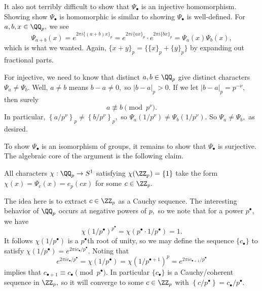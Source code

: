 It also not terribly difficult to show that $\Psi_\bullet$ is an injective homomorphism. Showing show $\Psi_\bullet$ is homomorphic is similar to showing $\Psi_\bullet$ is well-defined. For $a,b,x\in\QQ_p,$ we see
\[\Psi_{a+b}(x)=e^{2\pi i\{(a+b)x\}_p}=e^{2\pi i\{ax\}_p}\cdot e^{2\pi i\{bx\}_p}=\Psi_a(x)\Psi_b(x),\]
which is what we wanted. Again, $\{x+y\}_p=\{\{x\}_p+\{y\}_p\}$ by expanding out fractional parts.

For injective, we need to know that distinct $a,b\in\QQ_p$ give distinct characters $\Psi_a\ne\Psi_b.$ Well, $a\ne b$ means $b-a\ne0,$ so $|b-a|_p>0.$ If we let $|b-a|_p=p^{-\nu},$ then surely
\[a\not\equiv b\pmod{p^\nu}.\]
In particular, $\left\{a/p^\nu\right\}_p\ne\left\{b/p^\nu\right\}_p,$ so $\Psi_a\left(1/p^\nu\right)\ne\Psi_b\left(1/p^\nu\right).$ So $\Psi_a\ne\Psi_b,$ as desired.

To show $\Psi_\bullet$ is an isomorphism of groups, it remains to show that $\Psi_\bullet$ is surjective. The algebraic core of the argument is the following claim.
\begin{lemma}
    All characters $\chi:\QQ_p\to S^1$ satisfying $\chi(\ZZ_p)=\{1\}$ take the form $\chi(x)=\Psi_c(x)=e_p(cx)$ for some $c\in\ZZ_p.$
\end{lemma}
The idea here is to extract $c\in\ZZ_p$ as a Cauchy sequence. The interesting behavior of $\QQ_p$ occurs at negative powers of $p,$ so we note that for a power $p^\bullet,$ we have
\[\chi\left(1/p^\bullet\right)^{p^\bullet}=\chi\left(p^\bullet\cdot1/p^\bullet\right)=1.\]
It follows $\chi\left(1/p^\bullet\right)$ is a $p^\bullet$th root of unity, so we may define the sequence $\{c_\bullet\}$ to satisfy $\chi\left(1/p^\bullet\right)=e^{2\pi ic_\bullet/p^\bullet}.$ Noting that
\[e^{2\pi ic_\bullet/p^\bullet}=\chi\left(1/p^\bullet\right)=\chi\left(1/p^{\bullet+1}\right)^p=e^{2\pi ic_{\bullet+1}/p^\bullet}\]
implies that $c_{\bullet+1}\equiv c_\bullet\pmod{p^\bullet}.$ In particular $\{c_\bullet\}$ is a Cauchy/coherent sequence in $\ZZ_p,$ so it will converge to some $c\in\ZZ_p$ with $\left\{c/p^\bullet\right\}=c_\bullet/p^\bullet.$

